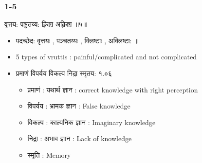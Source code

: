 \begin{frame}[fragile]\frametitle{1-5}

\begin{sanskrit}
वृत्तय: पञ्चतय्य: क्लिष्टा अक्लिष्टा ॥५॥
\end{sanskrit}


	\begin{itemize}
	\item पदच्छेद: वृत्तयः , पञ्चतय्यः , क्लिष्टाः , अक्लिष्टा: ॥
	\item 5 types of vruttis : painful/complicated and not complicated
	\item प्रमाणं विपर्यय विकल्प निद्रा स्मृतय: १.०६
		\begin{itemize}
		\item प्रमाणं : यथार्थ ज्ञान : correct knowledge with right perception
		\item विपर्यय : भ्रामक ज्ञान : False knowledge
		\item विकल्प : काल्पनिक ज्ञान : Imaginary knowledge
		\item निद्रा : अभाव ज्ञान : Lack of knowledge
		\item स्मृति : Memory
		\end{itemize}
	\end{itemize}

\end{frame}

